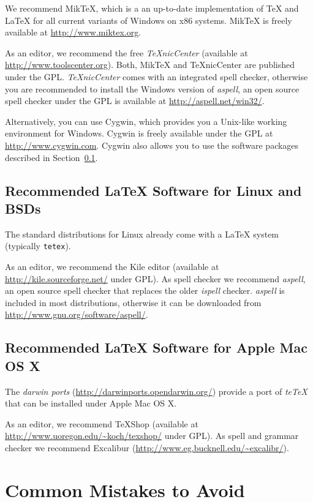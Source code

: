 \documentclass[10pt,a4paper,twoside,twocolumn]{article}
\begin{document}
We recommend MikTeX, which is a an up-to-date implementation of
{\TeX} and {\LaTeX} for all current variants of Windows on x86
systems. MikTeX is freely available at \url{http://www.miktex.org}.

As an editor, we recommend the free \emph{TeXnicCenter} (available
at \url{http://www.toolscenter.org}). Both, MikTeX and TeXnicCenter
are published under the \ac{GPL}. \emph{TeXnicCenter} comes with an
integrated spell checker, otherwise you are recommended to install
the Windows version of \emph{aspell}, an open source spell checker
under the \ac{GPL} is available at \url{http://aspell.net/win32/}.

Alternatively, you can use Cygwin, which provides you a Unix-like working
environment for Windows. Cygwin is freely available under the \ac{GPL}
at \url{http://www.cygwin.com}.
Cygwin also allows you to use the software packages described in
Section~\ref{sec_sw_linux_bsd}.

\subsection{Recommended {\LaTeX} Software for Linux and BSDs}
\label{sec_sw_linux_bsd}

The standard distributions for Linux already come with a {\LaTeX}
system (typically \texttt{tetex}).

As an editor, we recommend the Kile editor (available at
\url{http://kile.sourceforge.net/} under \ac{GPL}). As spell checker
we recommend \emph{aspell}, an open source spell checker that
replaces the older \emph{ispell} checker. \emph{aspell} is included
in most distributions, otherwise it can be downloaded from
\url{http://www.gnu.org/software/aspell/}.

\subsection{Recommended {\LaTeX} Software for Apple Mac OS X}

The \emph{darwin ports} (\url{http://darwinports.opendarwin.org/})
provide a port of \emph{teTeX} that can be installed under Apple Mac
OS X.

As an editor, we recommend TeXShop (available at
\url{http://www.uoregon.edu/~koch/texshop/} under \ac{GPL}). As
spell and grammar checker we recommend Excalibur
(\url{http://www.eg.bucknell.edu/~excalibr/}).

\section{Common Mistakes to Avoid\label{sec:checklist}}
\end{document}
